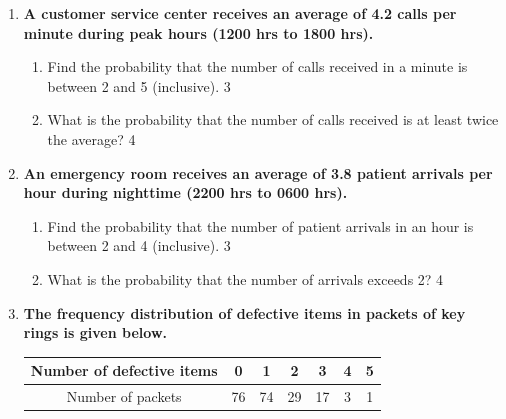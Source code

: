 \documentclass[a4paper,oneside]{book}
\begin{document}
\begin{enumerate}
  \begin{enumerate}
    \item
	Give an example where Poisson distribution is applicable. \hfill 1
    \item
	Find the relationship between expectation and standard deviation of Poisson distribution. \hfill 2
    \item  
	Find the probability that the number of calls is between 1 and 3 (inclusive). \hfill 3
    \item
	What is the probability that the number of calls received is greater than the average? \hfill 4
  \end{enumerate}
  
  \item  
  \textbf{A customer service center receives an average of 4.2 calls per minute during peak hours (1200 hrs to 1800 hrs).}  

  \begin{enumerate}  
    \item  
      Find the probability that the number of calls received in a minute is between 2 and 5 (inclusive). \hfill 3  
    \item  
      What is the probability that the number of calls received is at least twice the average? \hfill 4  
  \end{enumerate}  

\item  
  \textbf{An emergency room receives an average of 3.8 patient arrivals per hour during nighttime (2200 hrs to 0600 hrs).}  

  \begin{enumerate}  
    \item  
      Find the probability that the number of patient arrivals in an hour is between 2 and 4 (inclusive). \hfill 3  
    \item  
      What is the probability that the number of arrivals exceeds 2? \hfill 4  
  \end{enumerate}  

  
     \item
	  \textbf{The frequency distribution of defective items in packets of key rings is given below.} 
	  
	  \begin{table}[h]
	  \centering
\begin{tabular}{c|c|c|c|c|c|c}
Number of defective items & 0 & 1 & 2 & 3 & 4 & 5 \\ \hline
Number of packets & 76 & 74 & 29 & 17 & 3 & 1
\end{tabular}
\end{table}
  

\end{enumerate}
\end{document}
